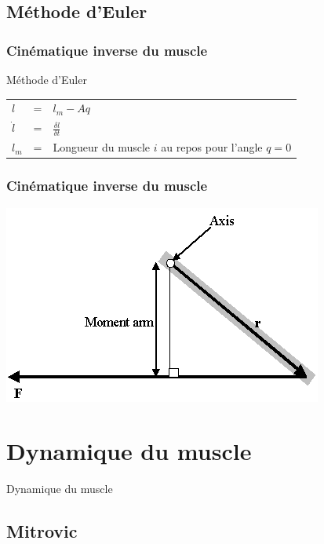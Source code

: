\documentclass{beamer}
\begin{document}
\subsection{Méthode d'Euler}

\begin{frame}
\frametitle{Cinématique inverse du muscle}
Méthode d'Euler\\
\begin{tabular}{lcl}
    $l$       & = & $l_m - A q $ \\
    $\dot{l}$ & = & $\frac{\delta l}{\delta t}$ \\
    $l_{m}$   & = & Longueur du muscle $i$ au repos pour l'angle $q = 0$ \\
\end{tabular}
\end{frame}

\begin{frame}
\frametitle{Cinématique inverse du muscle}
\begin{center}
        \includegraphics[width=.50\linewidth]{fig/moment_arm}
\end{center}
\end{frame}
    

\section{Dynamique du muscle}
\begin{frame}
\begin{center}
{\LARGE Dynamique du muscle}
\end{center}
\end{frame}

\subsection{Mitrovic}
\end{document}
